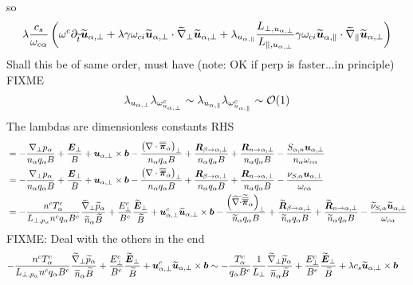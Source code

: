 %
so
%
\begin{align*}
 \lambda
 \frac{c_s}{\omega_{c\alpha}}
 \left(
 \omega^c
 \partial_{\widetilde{ t}} \widetilde{ \boldsymbol{u}}_{\alpha,\perp}
 +
 \lambda
 \gamma
 \omega_{ci}
 \widetilde{ \boldsymbol{u}}_{\alpha,\perp}\cdot\widetilde{ \nabla}_\perp\widetilde{ \boldsymbol{u}}_{\alpha,\perp}
 +
 \lambda_{u_{\alpha,\|}}
 \frac{L_{\perp, u_{\alpha,\perp}}}{L_{\|, u_{\alpha,\perp}}}
 \gamma
 \omega_{ci}
 \widetilde{ \boldsymbol{u}}_{\alpha,\|}\cdot\widetilde{ \nabla}_\|\widetilde{ \boldsymbol{u}}_{\alpha,\perp}
 \right)
\end{align*}
%
%
Shall this be of same order, must have (note: OK if perp is faster...in principle)
FIXME
%
\begin{align*}
 \lambda_{u_{\alpha,\perp}}
 \lambda_{\omega^c_{u_{\alpha,\perp}}}
 \sim
 \lambda_{u_{\alpha,\|}}
 \lambda_{\omega^c_{u_{\alpha,\|}}}
 \sim
 \mathcal{O}(1)
\end{align*}
%
The lambdas are dimensionless constants
%
RHS
%
\begin{align*}
&=
- \frac{ \nabla_\perp p_\alpha }{n_\alpha  q_\alpha B}
+ \frac{\boldsymbol{E}_\perp}{B}
+ \boldsymbol{u}_{\alpha,\perp}\times\boldsymbol{b}
- \frac{ \left(\nabla\cdot\boldsymbol{\overline{\overline{\pi}}}_\alpha\right)_\perp }{n_\alpha  q_\alpha B}
+ \frac{ \boldsymbol{R}_{\beta \to \alpha,\perp} }{n_\alpha q_\alpha B}
+ \frac{ \boldsymbol{R}_{n \to \alpha,\perp} }{n_\alpha q_\alpha B}
- \frac{ S_{\alpha,n}\boldsymbol{u}_{\alpha,\perp} }{n_\alpha \omega_{c\alpha}}
\\
&=
- \frac{ \nabla_\perp p_\alpha }{n_\alpha  q_\alpha B}
+ \frac{\boldsymbol{E}_\perp}{B}
+ \boldsymbol{u}_{\alpha,\perp}\times\boldsymbol{b}
- \frac{ \left(\nabla\cdot\boldsymbol{\overline{\overline{\pi}}}_\alpha\right)_\perp }{n_\alpha  q_\alpha B}
+ \frac{ \boldsymbol{R}_{\beta \to \alpha,\perp} }{n_\alpha q_\alpha B}
+ \frac{ \boldsymbol{R}_{n \to \alpha,\perp} }{n_\alpha q_\alpha B}
- \frac{ \nu_{S,\alpha}\boldsymbol{u}_{\alpha,\perp} }{\omega_{c\alpha}}
\\
&=
- \frac{n^c T^c_\alpha}{L_{\perp, p_\alpha}n^cq_\alpha B^c}
\frac{ \widetilde{ \nabla}_\perp \widetilde{ p}_\alpha }{\widetilde{ n}_\alpha \widetilde{ B}}
+ \frac{E_\perp^c}{B^c}
\frac{\widetilde{ \boldsymbol{E}}_\perp}{\widetilde{ B}}
+ \boldsymbol{u}^c_{\alpha,\perp}
\widetilde{ \boldsymbol{u}}_{\alpha,\perp}\times\boldsymbol{b}
- \frac{ \left(\widetilde{ \nabla\cdot}\widetilde{ \boldsymbol{\overline{\overline{\pi}}}}_\alpha\right)_\perp }{\widetilde{ n}_\alpha  q_\alpha B}
+ \frac{ \widetilde{ \boldsymbol{R}}_{\beta \to \alpha,\perp} }{\widetilde{ n}_\alpha q_\alpha B}
+ \frac{ \widetilde{ \boldsymbol{R}}_{n \to \alpha,\perp} }{\widetilde{ n}_\alpha q_\alpha B}
- \frac{ \widetilde{ \nu}_{S,\alpha}\widetilde{ \boldsymbol{u}}_{\alpha,\perp} }{\omega_{c\alpha}}
\end{align*}
%
FIXME: Deal with the others in the end
%
\begin{align*}
- \frac{n^c T^c_\alpha}{L_{\perp, p_\alpha}n^cq_\alpha B^c}
\frac{ \widetilde{ \nabla}_\perp \widetilde{ p}_\alpha }{\widetilde{ n}_\alpha \widetilde{ B}}
+ \frac{E_\perp^c}{B^c}
\frac{\widetilde{ \boldsymbol{E}}_\perp}{\widetilde{ B}}
+ \boldsymbol{u}^c_{\alpha,\perp}
\widetilde{ \boldsymbol{u}}_{\alpha,\perp}\times\boldsymbol{b}
&\sim
- \frac{T^c_\alpha}{q_\alpha B^c}
\frac{1}{L_{\perp}}
\frac{ \widetilde{ \nabla}_\perp \widetilde{ p}_\alpha }{\widetilde{ n}_\alpha \widetilde{ B}}
+ \frac{E_\perp^c}{B^c}
\frac{\widetilde{ \boldsymbol{E}}_\perp}{\widetilde{ B}}
+ \lambda c_s
\widetilde{ \boldsymbol{u}}_{\alpha,\perp}\times\boldsymbol{b}
\end{align*}
